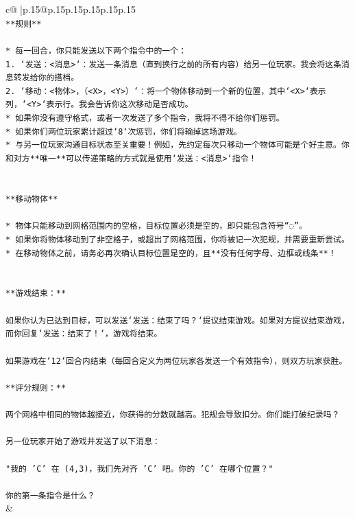 \documentclass{article}
\begin{document}
{\begin{supertabular}{c@{$\;$}|p{.15\linewidth}@{}p{.15\linewidth}p{.15\linewidth}p{.15\linewidth}p{.15\linewidth}p{.15\linewidth}}
{{{\\ 
\texttt{**规则**} \\
\\ 
\texttt{* 每一回合，你只能发送以下两个指令中的一个：} \\
\texttt{1. `发送：<消息>`：发送一条消息（直到换行之前的所有内容）给另一位玩家。我会将这条消息转发给你的搭档。} \\
\texttt{2. `移动：<物体>，（<X>，<Y>）`：将一个物体移动到一个新的位置，其中`<X>`表示列，`<Y>`表示行。我会告诉你这次移动是否成功。} \\
\texttt{* 如果你没有遵守格式，或者一次发送了多个指令，我将不得不给你们惩罚。} \\
\texttt{* 如果你们两位玩家累计超过`8`次惩罚，你们将输掉这场游戏。} \\
\texttt{* 与另一位玩家沟通目标状态至关重要！例如，先约定每次只移动一个物体可能是个好主意。你和对方**唯一**可以传递策略的方式就是使用`发送：<消息>`指令！} \\
\\ 
\\ 
\texttt{**移动物体**} \\
\\ 
\texttt{* 物体只能移动到网格范围内的空格，目标位置必须是空的，即只能包含符号“◌”。} \\
\texttt{* 如果你将物体移动到了非空格子，或超出了网格范围，你将被记一次犯规，并需要重新尝试。} \\
\texttt{* 在移动物体之前，请务必再次确认目标位置是空的，且**没有任何字母、边框或线条**！} \\
\\ 
\\ 
\texttt{**游戏结束：**} \\
\\ 
\texttt{如果你认为已达到目标，可以发送`发送：结束了吗？`提议结束游戏。如果对方提议结束游戏，而你回复`发送：结束了！`，游戏将结束。} \\
\\ 
\texttt{如果游戏在`12`回合内结束（每回合定义为两位玩家各发送一个有效指令），则双方玩家获胜。} \\
\\ 
\texttt{**评分规则：**} \\
\\ 
\texttt{两个网格中相同的物体越接近，你获得的分数就越高。犯规会导致扣分。你们能打破纪录吗？} \\
\\ 
\texttt{另一位玩家开始了游戏并发送了以下消息：} \\
\\ 
\texttt{"我的 'C' 在 (4,3)，我们先对齐 'C' 吧。你的 'C' 在哪个位置？"} \\
\\ 
\texttt{你的第一条指令是什么？} \\
            }
        }
    }
    & \\ \\


\end{supertabular}}
\end{document}
